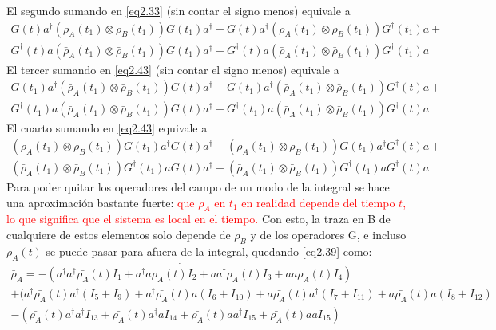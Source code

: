 \documentclass{book}
\begin{document}
 El segundo sumando en \textcolor{blue}{\ref{eq2.33}} (sin contar el signo menos) equivale a
 \begin{equation}\label{eq2.47}\begin{aligned} {G(t)a^\dag(\bar{\rho}_A(t_1)\otimes\bar{\rho}_B(t_1))G(t_1)a^\dag+ G(t)a^\dag(\bar{\rho}_A(t_1)\otimes\bar{\rho}_B(t_1))G^\dag(t_1)a+} \\ {G^\dag(t)a(\bar{\rho}_A(t_1)\otimes\bar{\rho}_B(t_1))G(t_1)a^\dag+ G^\dag(t)a(\bar{\rho}_A(t_1)\otimes\bar{\rho}_B(t_1))G^\dag(t_1)a }\end{aligned}\end{equation}
 El tercer sumando en \textcolor{blue}{\ref{eq2.43}} (sin contar el signo menos) equivale a
 \begin{equation}\label{eq2.48}\begin{aligned} { G(t_1)a^\dag(\bar{\rho}_A(t_1)\otimes\bar{\rho}_B(t_1))G(t)a^\dag+ G(t_1)a^\dag(\bar{\rho}_A(t_1)\otimes\bar{\rho}_B(t_1))G^\dag(t)a+} \\ {G^\dag(t_1)a(\bar{\rho}_A(t_1)\otimes\bar{\rho}_B(t_1))G(t)a^\dag+ G^\dag(t_1)a(\bar{\rho}_A(t_1)\otimes\bar{\rho}_B(t_1))G^\dag(t)a}\end{aligned}\end{equation}
 El cuarto sumando en  \textcolor{blue}{\ref{eq2.43}} equivale a
 \begin{equation}\label{eq2.49}\begin{aligned} {(\bar{\rho}_A(t_1)\otimes\bar{\rho}_B(t_1))G(t_1)a^\dag G(t)a^\dag+(\bar{\rho}_A(t_1)\otimes\bar{\rho}_B(t_1))G(t_1)a^\dag G^\dag(t)a+}\\  { (\bar{\rho}_A(t_1)\otimes\bar{\rho}_B(t_1))G^\dag(t_1)a G(t)a^\dag +(\bar{\rho}_A(t_1)\otimes\bar{\rho}_B(t_1))G^\dag(t_1)a G^\dag(t)a }\end{aligned}\end{equation}
 Para poder quitar los operadores del campo de un modo de la integral se hace una aproximación bastante fuerte: \textcolor{red}{que $\rho_A$ en $t_1$ en realidad depende del tiempo $t$, lo que significa que el sistema es local en el tiempo.}
 Con esto, la traza en B de cualquiere de estos elementos solo depende de $\rho_B$ y de los operadores G, e incluso $\rho_A(t)$ se puede pasar para afuera de la integral, quedando \textcolor{blue}{\ref{eq2.39}} como:
  \begin{equation}\label{eq2.50}\begin{aligned}\dot{\bar{\rho}_A=-(a^\dag a^\dag \bar{\rho_A}(t)I_1+a^\dag a \rho_A(t) I_2+ aa^\dag \rho_A(t) I_3+aa\rho_A(t) I_4)} \\ {+(a^\dag\bar{\rho_A}(t)a^\dag (I_5+I_9)+a^\dag\bar{\rho_A}(t)a (I_6+I_{10})+ a\bar{\rho_A}(t)a^\dag (I_7+I_{11})+a\bar{\rho_A}(t)a (I_8+I_{12})} \\ {-(\bar{\rho_A}(t)a^\dag a^\dag I_{13}+\bar{\rho_A}(t)a^\dag a I_{14}+ \bar{\rho_A}(t)aa^\dag I_{15}+\bar{\rho_A}(t)aa I_{15})} \end{aligned}\end{equation}
\end{document}
